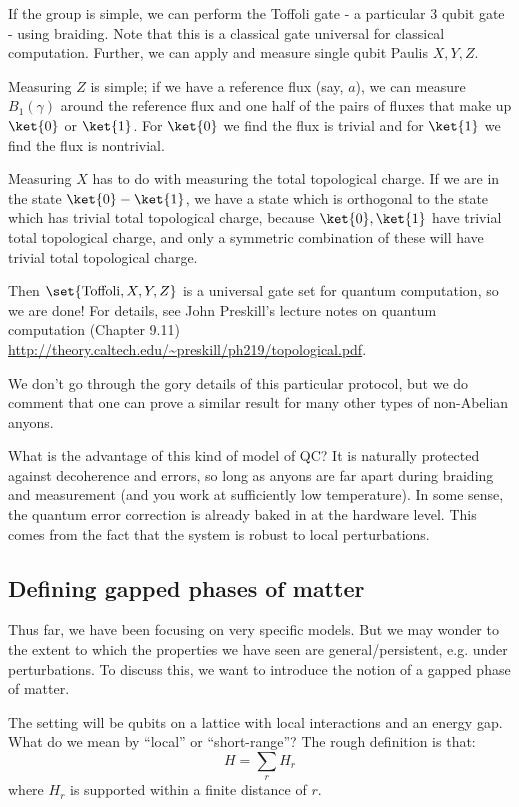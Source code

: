 If the group is simple, we can perform the Toffoli gate - a particular 3 qubit gate - using braiding. Note that this is a classical gate universal for classical computation. Further, we can apply and measure single qubit Paulis $X,Y,Z$. 

Measuring $Z$ is simple; if we have a reference flux (say, $a$), we can measure $B_1(\gamma)$ around the reference flux and one half of the pairs of fluxes that make up $\ket{0}$ or $\ket{1}$. For $\ket{0}$ we find the flux is trivial and for $\ket{1}$ we find the flux is nontrivial.

Measuring $X$ has to do with measuring the total topological charge. If we are in the state $\ket{0} - \ket{1}$, we have a state which is orthogonal to the state which has trivial total topological charge, because $\ket{0}, \ket{1}$ have trivial total topological charge, and only a symmetric combination of these will have trivial total topological charge.

Then $\set{\text{Toffoli}, X, Y, Z}$ is a universal gate set for quantum computation, so we are done! For details, see John Preskill's lecture notes on quantum computation (Chapter 9.11) \url{http://theory.caltech.edu/~preskill/ph219/topological.pdf}.

We don't go through the gory details of this particular protocol, but we do comment that one can prove a similar result for many other types of non-Abelian anyons.

What is the advantage of this kind of model of QC? It is naturally protected against decoherence and errors, so long as anyons are far apart during braiding and measurement (and you work at sufficiently low temperature). In some sense, the quantum error correction is already baked in at the hardware level. This comes from the fact that the system is robust to local perturbations.

\subsection{Defining gapped phases of matter}
Thus far, we have been focusing on very specific models. But we may wonder to the extent to which the properties we have seen are general/persistent, e.g. under perturbations. To discuss this, we want to introduce the notion of a gapped phase of matter.

The setting will be qubits on a lattice with local interactions and an energy gap. What do we mean by ``local'' or ``short-range''? The rough definition is that:
\begin{equation}
    H = \sum_r H_r
\end{equation}
where $H_r$ is supported within a finite distance of $r$.

